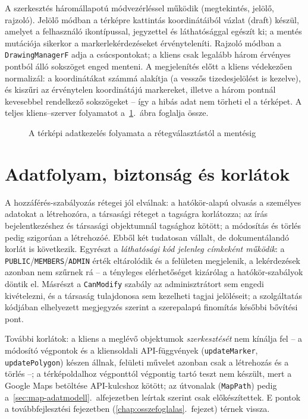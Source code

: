 A szerkesztés háromállapotú módvezérléssel működik (megtekintés, jelölő, rajzoló). Jelölő módban
a térképre kattintás koordinátáiból vázlat (draft) készül, amelyet a felhasználó ikontípussal,
jegyzettel és láthatósággal egészít ki; a mentés mutációja sikerkor a markerlekérdezéseket
érvényteleníti. Rajzoló módban a \texttt{DrawingManagerF} adja a csúcspontokat; a kliens csak
legalább három érvényes pontból álló sokszöget enged menteni. A megjelenítés előtt a kliens
védekezően normalizál: a koordinátákat számmá alakítja (a vesszős tizedesjelölést is kezelve), és
kiszűri az érvénytelen koordinátájú markereket, illetve a három pontnál kevesebbel rendelkező
sokszögeket -- így a hibás adat nem törheti el a térképet. A teljes kliens--szerver folyamatot
a~\ref{fig:map-flow}.~ábra foglalja össze.

\begin{figure}[htbp]
	\centering
	\caption{A térképi adatkezelés folyamata a rétegválasztástól a mentésig}
	\label{fig:map-flow}
\end{figure}

\section{Adatfolyam, biztonság és korlátok}
\label{sec:map-korlatok}

A hozzáférés-szabályozás rétegei jól elválnak: a hatókör-alapú olvasás a személyes adatokat a
létrehozóra, a társasági réteget a tagságra korlátozza; az írás bejelentkezéshez és társasági
objektumnál tagsághoz kötött; a módosítás és törlés pedig szigorúan a létrehozóé. Ebből két
tudatosan vállalt, de dokumentálandó korlát is következik. Egyrészt a \emph{láthatósági kód
jelenleg címkeként működik}: a \texttt{PUBLIC}/\texttt{MEMBERS}/\texttt{ADMIN} érték eltárolódik
és a felületen megjelenik, a lekérdezések azonban nem szűrnek rá -- a tényleges elérhetőséget
kizárólag a hatókör-szabályok döntik el. Másrészt a \texttt{CanModify} szabály az adminisztrátort
sem engedi kivételezni, és a társaság tulajdonosa sem kezelheti tagjai jelöléseit; a szolgáltatás
kódjában elhelyezett megjegyzés szerint a szerepalapú finomítás későbbi bővítési pont.

További korlátok: a kliens a meglévő objektumok \emph{szerkesztését} nem kínálja fel -- a
módosító végpontok és a kliensoldali API-függvények (\texttt{updateMarker},
\texttt{updatePolygon}) készen állnak, felületi művelet azonban csak a létrehozás és a törlés --;
a térképoldalhoz végponttól végpontig tartó teszt nem készült, mert a Google Maps betöltése
API-kulcshoz kötött; az útvonalak (\texttt{MapPath}) pedig a~\ref{sec:map-adatmodell}.~alfejezetben
leírtak szerint csak előkészítettek. E pontok a továbbfejlesztési fejezetben
(\ref{chap:osszefoglalas}.~fejezet) térnek vissza.
